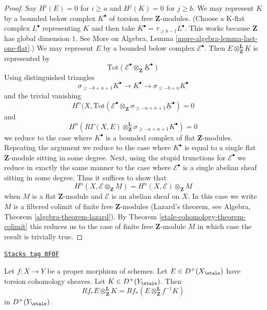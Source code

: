 \begin{proof}
Say $H^i(E) = 0$ for $i \geq a$ and $H^j(K) = 0$ for $j \geq b$.
We may represent $K$ by a bounded below complex
$K^\bullet$ of torsion free $\mathbf{Z}$-modules.
(Choose a K-flat complex $L^\bullet$ representing $K$ and then
take $K^\bullet = \tau_{\geq b - 1}L^\bullet$. This works because
$\mathbf{Z}$ has global dimension $1$. See
More on Algebra, Lemma \ref{more-algebra-lemma-last-one-flat}.)
We may represent $E$ by a bounded below complex
$\mathcal{E}^\bullet$.
Then $E \otimes_\mathbf{Z}^\mathbf{L} \underline{K}$ is
represented by
$$
\text{Tot}(\mathcal{E}^\bullet \otimes_\mathbf{Z} \underline{K}^\bullet)
$$
Using distinguished triangles
$$
\sigma_{\geq -b + n + 1}K^\bullet
\to K^\bullet \to
\sigma_{\leq -b + n}K^\bullet
$$
and the trivial vanishing
$$
H^n(X,
\text{Tot}(\mathcal{E}^\bullet \otimes_\mathbf{Z}
\sigma_{\geq -a + n + 1}\underline{K}^\bullet) = 0
$$
and
$$
H^n(R\Gamma(X, E)
\otimes_\mathbf{Z}^\mathbf{L} \sigma_{\geq -a + n + 1}K^\bullet) = 0
$$
we reduce to the case where $K^\bullet$ is a bounded complex of
flat $\mathbf{Z}$-modules. Repeating the argument we reduce to the
case where $K^\bullet$ is equal to a single flat $\mathbf{Z}$-module
sitting in some degree. Next, using the stupid
trunctions for $\mathcal{E}^\bullet$
we reduce in exactly the same manner to the case where
$\mathcal{E}^\bullet$ is a single abelian sheaf sitting
in some degree. Thus it suffices to show that
$$
H^n(X, \mathcal{E} \otimes_\mathbf{Z} \underline{M}) =
H^n(X, \mathcal{E}) \otimes_\mathbf{Z} M
$$
when $M$ is a flat $\mathbf{Z}$-module and $\mathcal{E}$
is an abelian sheaf on $X$. In this case we
write $M$ is a filtered colimit of finite free $\mathbf{Z}$-modules
(Lazard's theorem, see Algebra, Theorem \ref{algebra-theorem-lazard}).
By Theorem \ref{etale-cohomology-theorem-colimit} this reduces us to the case of finite free
$\mathbf{Z}$-module $M$ in which case the result is trivially true.
\end{proof}

\begin{lemma}
\label{etale-cohomology-lemma-projection-formula-proper}
\href{https://stacks.math.columbia.edu/tag/0F0F}{\texttt{Stacks tag 0F0F}}

Let $f : X \to Y$ be a proper morphism of schemes.
Let $E \in D^+(X_\etale)$ have torsion cohomology sheaves.
Let $K \in D^+(Y_\etale)$. Then
$$
Rf_*E \otimes_\mathbf{Z}^\mathbf{L} K =
Rf_*(E \otimes_\mathbf{Z}^\mathbf{L} f^{-1}K)
$$
in $D^+(Y_\etale)$.
\end{lemma}

